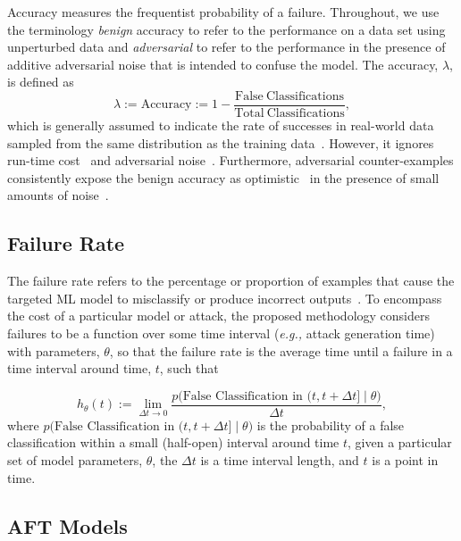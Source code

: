 \documentclass[conference]{IEEEtran}%
\begin{document}
Accuracy measures the frequentist probability of a failure. 
Throughout, we use the terminology \textit{benign} accuracy to refer to the performance on a data set using unperturbed data and \textit{adversarial} to refer to the performance in the presence of additive adversarial noise that is intended to confuse the model. 
The accuracy, $\lambda$, is defined as
\begin{equation}
    \lambda:= \mathrm{Accuracy} := 1 - \frac{\mathrm{False~Classifications}}{\mathrm{Total~Classifications}},
    \label{eq:acc}
\end{equation}
which is generally assumed to indicate the rate of successes in real-world data sampled from the same distribution as the training data~\cite{tan2021critical}. 
However, it ignores run-time cost~\cite{desislavov2021compute,bailly2022effects} and adversarial noise~\cite{croce_reliable_2020}. 
Furthermore, adversarial counter-examples consistently expose the benign accuracy as optimistic~\cite{carlini_towards_2017,adversarialpatch,pixelattack,biggio_poisoning_2013,meyers} in the presence of small amounts of noise~\cite{pixelattack}.

\subsection{Failure Rate}
\label{failure_rate}

The failure rate refers to the percentage or proportion of examples that cause the targeted ML model to misclassify or produce incorrect outputs~\cite{meyers}. 
To encompass the cost of a particular model or attack, the proposed methodology considers failures to be a function over some time interval (\textit{e.g.,} attack generation time) with parameters, $\theta$, so that the failure rate is the average time until a failure in a time interval around time, $t$, such that

\[
    h_{\theta}(t) := \lim_{\Delta t \rightarrow 0} \frac{p\big(\textrm{False~Classification~in~} (t, t + \Delta t] \mid \theta\big)}{\Delta t},
\]
where
$p\big(\textrm{False~Classification~in~} (t, t + \Delta t] \mid \theta\big)$
is the probability of a false classification within a small (half-open) interval around time $t$, given a particular set of model parameters, $\theta$, the $\Delta t$ is a time interval length, and $t$ is a point in time.

\subsection{AFT Models}
\label{survival_time}
\end{document}
